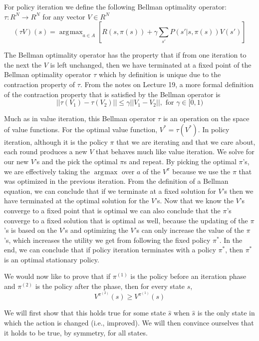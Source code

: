 \documentclass[solution, letterpaper]{cs121}
\DeclareMathOperator*{\argmax}{\arg\!\max}
\begin{document}
For policy iteration we define the following Bellman optimality operator: $\tau : R^N \rightarrow R^N$ for any vector $V \in R^N$
\[(\tau V)(s) = \argmax_{a \in A}  \left[ R(s,\pi(s) ) + \gamma \sum_{s'} P(s' | s,\pi(s))V(s')\right ]\]

The Bellman optimality operator has the property that if from one iteration to the next the $V$ is left unchanged, then we have terminated at a fixed point of the Bellman optimality operator $\tau$ which by definition is unique due to the contraction property of $\tau$.
From the notes on Lecture 19, a more formal definition of the contraction property that is satisfied by the Bellman operator is \[ ||\tau(V_1) - \tau(V_2) || \leq \gamma || V_1 - V_2 ||, \text{ for } \gamma \in [0,1)\]

Much as in value iteration, this Bellman operator $\tau$ is an operation on the space of value functions. For the optimal value function, $V^* = \tau(V^*)$. In policy iteration, although it is the policy $\pi$ that we are iterating and that we care about, each round produces a new $V$ that behaves much like value iteration. We solve for our new $V$'s and the pick the optimal $\pi$s and repeat. By picking the optimal $\pi$'s, we are effectively taking the $\argmax$ over $a$ of the $V^{\pi}$ because we use the $\pi$ that was optimized in the previous iteration. From the definition of a Bellman equation, we can conclude that if we terminate at a fixed solution for $V$'s then we have terminated at the optimal solution for the $V$'s. Now that we know the $V$'s converge to a fixed point that is optimal we can also conclude that the $\pi$'s converge to a fixed solution that is optimal as well, because the updating of the $\pi$'s is based on the $V$'s and optimizing the $V$'s can only increase the value of the $\pi$'s, which increases the utility we get from following the fixed policy $\pi^*$. In the end, we can conclude that if policy iteration terminates with a policy $\pi^*$, then $\pi^*$ is an optimal stationary policy. 

\subproblem{} %
We would now like to prove that if $\pi^{(1)}$ is the policy before an iteration  phase and $\pi^{(2)}$ is the policy after the phase, then for every state $s$, 
\[ V^{\pi^{(2)}} (s) \ge V^{\pi^{(1)}}(s) \]

We will first show that this holds true for some state $\hat{s}$ when $\hat{s}$ is the only state in which the action is changed (i.e., improved). We will then convince ourselves that it holds to be true, by symmetry, for all states.  
\end{document}

